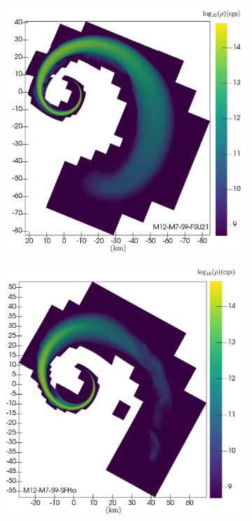 \begin{figure}
\begin{subfigure}[b]{0.475\textwidth}
		\includegraphics[width=\linewidth]{images/rho_FSU21_M12-merger-inertial}
		\label{fig:rho_M12_FSU21}
	\centering
	\end{subfigure}
	\begin{subfigure}[b]{0.475\textwidth}
		\centering
		\includegraphics[width=\linewidth]{images/rho_SFHo_M12-merger-inertial}

\end{subfigure}
\end{figure}
